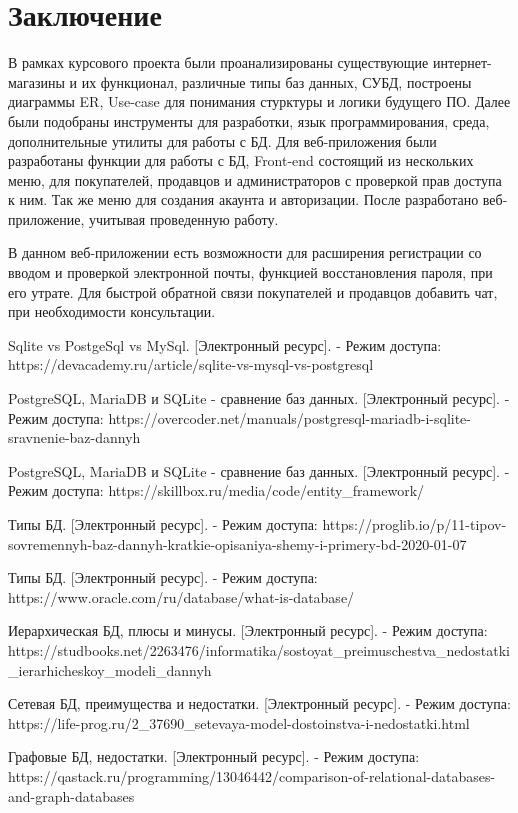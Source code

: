 \chapter*{Заключение}
В рамках курсового проекта были проанализированы существующие интернет-магазины и их функционал, различные типы баз данных, СУБД, построены диаграммы ER, Use-case для понимания стурктуры и логики будущего ПО.  Далее были подобраны инструменты для разработки, язык программирования, среда, дополнительные утилиты для работы с БД. Для веб-приложения были разработаны функции для работы с БД, Front-end состоящий из нескольких меню, для покупателей, продавцов и администраторов с проверкой прав доступа к ним. Так же меню для создания акаунта и авторизации. После разработано веб-приложение, учитывая проведенную работу.

\hspace{0cm} В данном веб-приложении есть возможности для расширения регистрации со вводом и проверкой электронной почты, функцией восстановления пароля, при его утрате. Для быстрой обратной связи покупателей и продавцов добавить чат, при необходимости консультации.


\begin{thebibliography}{3}
  Sqlite vs PostgeSql vs MySql. [Электронный ресурс]. - Режим доступа:  https://devacademy.ru/article/sqlite-vs-mysql-vs-postgresql
  
  PostgreSQL, MariaDB и SQLite - сравнение баз данных. [Электронный ресурс]. - Режим доступа:  https://overcoder.net/manuals/postgresql-mariadb-i-sqlite-sravnenie-baz-dannyh
  
  PostgreSQL, MariaDB и SQLite - сравнение баз данных. [Электронный ресурс]. - Режим доступа: 
  https://skillbox.ru/media/code/entity\_framework/
  
  Типы БД. [Электронный ресурс]. - Режим доступа:  https://proglib.io/p/11-tipov-sovremennyh-baz-dannyh-kratkie-opisaniya-shemy-i-primery-bd-2020-01-07
  
  Типы БД. [Электронный ресурс]. - Режим доступа: https://www.oracle.com/ru/database/what-is-database/
  
  Иерархическая БД, плюсы и минусы. [Электронный ресурс]. - Режим доступа:  https://studbooks.net/2263476/informatika/sostoyat\_preimuschestva\_nedostatki\_ierarhicheskoy\_modeli\_dannyh
  
  Сетевая БД, преимущества и недостатки. [Электронный ресурс]. - Режим доступа:  https://life-prog.ru/2\_37690\_setevaya-model-dostoinstva-i-nedostatki.html
  
  Графовые БД, недостатки. [Электронный ресурс]. - Режим доступа: https://qastack.ru/programming/13046442/comparison-of-relational-databases-and-graph-databases
\end{thebibliography}